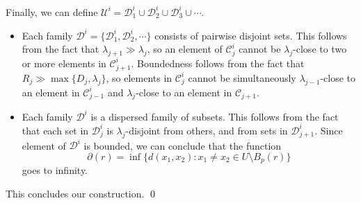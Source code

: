 \documentclass {amsart}
\newcommand {\U}        {\mathcal{U}}
\newcommand {\C}        {\mathcal{C}}
\newcommand {\D}        {\mathcal{D}}
\theoremstyle {definition}
\begin{document}
Finally, we can define \( \U^{i} = \D_1^{i} \cup \D_2^{i} \cup \D_3 ^{i} \cup
\cdots \).
\begin{itemize}

\item Each family \( \D^i = \{ \D^i_1, \D^i_2, \cdots \} \) consists of
        pairwise disjoint sets. This follows from the fact that \( \lambda_{j+1} \gg
  \lambda _j\), so an element of \( \C_j ^{i} \) cannot be \( \lambda_j
  \)-close to two or more elements in \( \C_{j+1}^{i} \). Boundedness
  follows from the fact that \( R_j \gg \max \{ D_j, \lambda_j \} \), so
  elements in \( \C_j ^{i} \) cannot be simultaneously \( \lambda_{j-1}
  \)-close to an element in \( \C_{j-1}^{i} \) and \( \lambda_j \)-close to
  an element in \( \C_{j+1} \).

    \item Each family \( \D^{i} \) is a dispersed family of subsets. This
        follows from the fact that each set in \( \D^i_j \) is \( \lambda_j
        \)-disjoint from others, and from sets in \( \D^{i}_{j+1} \). Since
        element of \( \D^{i} \) is bounded, we can conclude that the function 
        \[
            \partial (r) = \inf \{ d(x_1, x_2) 
                    : x_1 \neq x_2 \in U \setminus B _{p} (r) \}
        \]
        goes to infinity.
\end{itemize}
This concludes our construction.
\qed
\end{document}
